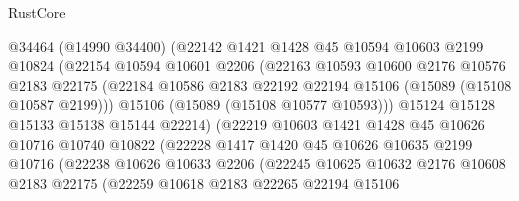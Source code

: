 \begin{lexlean}{RustCore}
\begin{coremodule}
                        @34464
                        (@14990 @34400)
                        (@22142
                          @1421
                          @1428
                          @45
                          @10594
                          @10603
                          @2199
                          @10824
                          (@22154
                            @10594
                            @10601
                            @2206
                            (@22163
                              @10593
                              @10600
                              @2176
                              @10576
                              @2183
                              @22175
                              (@22184
                                @10586
                                @2183
                                @22192
                                @22194
                                @15106
                                (@15089 (@15108 @10587 @2199)))
                              @15106
                              (@15089 (@15108 @10577 @10593)))
                            @15124
                            @15128
                            @15133
                            @15138
                            @15144
                            @22214)
                          (@22219
                            @10603
                            @1421
                            @1428
                            @45
                            @10626
                            @10716
                            @10740
                            @10822
                            (@22228
                              @1417
                              @1420
                              @45
                              @10626
                              @10635
                              @2199
                              @10716
                              (@22238
                                @10626
                                @10633
                                @2206
                                (@22245
                                  @10625
                                  @10632
                                  @2176
                                  @10608
                                  @2183
                                  @22175
                                  (@22259
                                    @10618
                                    @2183
                                    @22265
                                    @22194
                                    @15106

\end{coremodule}
\end{lexlean}
